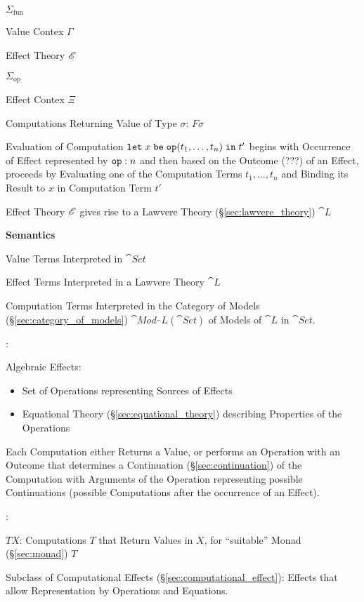 $\Sigma_{\mathrm{fun}}$

Value Contex $\Gamma$

Effect Theory $\mathscr{E}$

$\Sigma_{\mathrm{op}}$

Effect Contex $\Xi$

Computations Returning Value of Type $\sigma$: $F \sigma$

Evaluation of Computation $\mathtt{let}\; x \;\mathtt{be}\; \mathtt{op}(t_1,
\ldots, t_n) \;\mathtt{in}\; t'$ begins with Occurrence of Effect
represented by $\mathtt{op}:n$ and then based on the Outcome (???) of an
Effect, proceeds by Evaluating one of the Computation Terms $t_1,
\ldots, t_n$ and Binding its Result to $x$ in Computation Term $t'$

Effect Theory $\mathscr{E}$ gives rise to a Lawvere Theory
(\S\ref{sec:lawvere_theory}) $\cat{L}$

\textbf{Semantics}

Value Terms Interpreted in $\cat{Set}$

Effect Terms Interpreted in a Lawvere Theory $\cat{L}$

Computation Terms Interpreted in the Category of Models
(\S\ref{sec:category_of_models}) $\cat{Mod}_\cat{L}(\cat{Set})$ of
Models of $\cat{L}$ in $\cat{Set}$.



\cite{plotkin-pretnar13}:

Algebraic Effects:
\begin{itemize}
  \item Set of Operations representing Sources of Effects
  \item Equational Theory (\S\ref{sec:equational_theory}) describing
    Properties of the Operations
\end{itemize}

Each Computation either Returns a Value, or performs an Operation with
an Outcome that determines a Continuation (\S\ref{sec:continuation})
of the Computation with Arguments of the Operation representing
possible Continuations (possible Computations after the occurrence of
an Effect).



\cite{plotkin-pretnar09}:

$T X$: Computations $T$ that Return Values in $X$, for ``suitable''
Monad (\S\ref{sec:monad}) $T$

Subclass of Computational Effects (\S\ref{sec:computational_effect}):
Effects that allow Representation by Operations and Equations.

